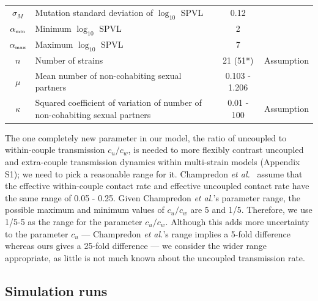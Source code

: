 \documentclass[10pt,letterpaper]{article}
\newcommand{\etal}{\textit{et al.}}
\newcommand{\tsub}[2]{#1_{{\textrm{\tiny #2}}}}
\begin{document}
\begin{table}[h!]
\begin{tabular}{c p{2in} c l}
$\sigma_M$ & Mutation standard deviation of $\log_{10}$ SPVL & 0.12 & \cite{shirreff_transmission_2011} \\
$\tsub{\alpha}{min}$ & Minimum $\log_{10}$ SPVL & 2 & \cite{shirreff_transmission_2011}\\
$\tsub{\alpha}{max}$ & Maximum $\log_{10}$ SPVL & 7 & \cite{shirreff_transmission_2011}\\
$n$ & Number of strains & 21 (51*) & Assumption\\
$\mu$ & Mean number of non-cohabiting sexual partners & 0.103 - 1.206 & \cite{omori2015dynamics}\\
$\kappa$ & Squared coefficient of variation of number of non-cohabiting sexual partners & 0.01 - 100 & Assumption\\
\hline
\end{tabular}
\label{table:parmsTable}
\end{table}

The one completely new parameter in our model, the ratio of uncoupled to within-couple transmission $c_u/c_w$, is needed to more flexibly contrast uncoupled and extra-couple transmission dynamics within multi-strain models (Appendix S1); we need to pick a reasonable range for it. Champredon \etal\ \cite{champredon_hiv_2013} assume that the effective within-couple contact rate and effective uncoupled contact rate have the same range of 0.05 - 0.25.  Given Champredon \etal's parameter range, the possible maximum and minimum values of $c_u/c_w$ are 5 and 1/5. Therefore, we use 1/5-5 as the range for the parameter $c_u/c_w$. Although this adds more uncertainty to the parameter $c_u$ --- Champredon \etal's range implies a 5-fold difference whereas ours gives a 25-fold difference --- we consider the wider range appropriate, as little is not much known about the uncoupled transmission rate.


\subsection*{Simulation runs}
\end{document}
